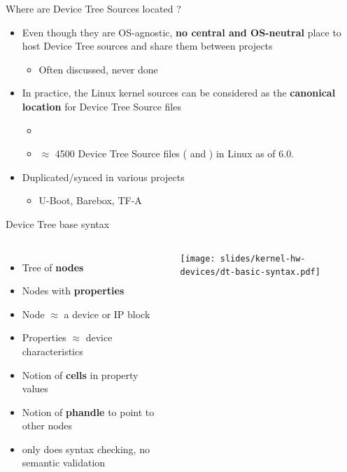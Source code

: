 \begin{frame}{Where are Device Tree Sources located ?}
  \begin{itemize}
  \item Even though they are OS-agnostic, {\bf no central and
      OS-neutral} place to host Device Tree sources and share them
    between projects
    \begin{itemize}
    \item Often discussed, never done
    \end{itemize}
  \item In practice, the Linux kernel sources can be considered as the
    {\bf canonical location} for Device Tree Source files
    \begin{itemize}
    \item {}
    \item $\approx$ 4500 Device Tree Source files ( and
          ) in Linux as of 6.0.
    \end{itemize}
  \item Duplicated/synced in various projects
    \begin{itemize}
    \item U-Boot, Barebox, TF-A
    \end{itemize}
  \end{itemize}
\end{frame}

\begin{frame}{Device Tree base syntax}
  \begin{columns}
    \begin{itemize}
    \item Tree of {\bf nodes}
    \item Nodes with {\bf properties}
    \item Node $\approx$ a device or IP block
    \item Properties $\approx$ device characteristics
    \item Notion of {\bf cells} in property values
    \item Notion of {\bf phandle} to point to other nodes
    \item {} only does syntax checking, no semantic validation
    \end{itemize}
    \begin{center}
      \texttt{[image: slides/kernel-hw-devices/dt-basic-syntax.pdf]}
    \end{center}
  \end{columns}
\end{frame}

